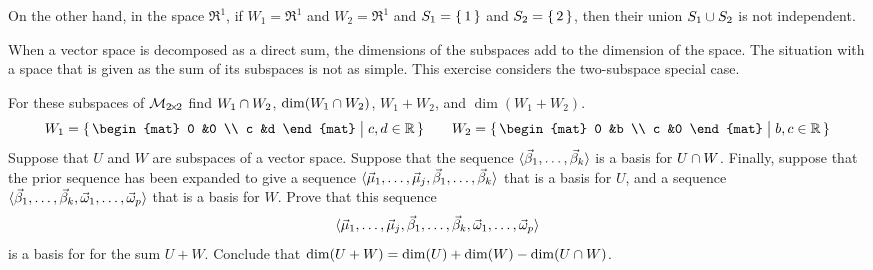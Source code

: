 \begin{exercises}
\begin{answer}
\begin{exparts}
          On the other hand, in the space $\Re^1$, 
          if \( W_1=\Re^1 \) and \( W_2=\Re^1 \) and $S_1=\mbox{$\{\,1\,\}$}$ and
          $S_2=\mbox{$\{\,2\,\}$}$, then their union $S_1\cup S_2$ is not independent.
      \end{exparts}  
     \end{answer}
  \item \label{exer:BasesSumTwoSubs}
    When a vector space is decomposed as a direct sum, the dimensions
    of the subspaces add to the dimension of the space.
    The situation with a space that is given as the sum of its subspaces 
    is not as simple.
    This exercise considers the two-subspace special case.
    \begin{exparts}
      \partsitem For these subspaces of \( \mathcal{M}_{2 \! \times \! 2} \) find
        \( W_1\cap W_2 \), \( \dim(W_1\cap W_2) \),
        \( W_1+W_2 \), and \( \dim(W_1+W_2) \).
        \begin{equation*}
          W_1=\set{\begin{mat}
                    0  &0  \\
                    c  &d
                  \end{mat} \suchthat c,d\in\Re  }
          \qquad
         W_2=\set{\begin{mat}
                    0  &b  \\
                    c  &0
                  \end{mat} \suchthat b,c\in\Re  }
       \end{equation*}
     \partsitem Suppose that \( U \) and \( W \) are subspaces 
       of a vector space.
       Suppose that the sequence 
       \( \langle\vec{\beta}_1,\dots,\vec{\beta}_k\rangle \) 
       is a basis for
       \( U\cap W \).
       Finally, suppose that the prior sequence has been expanded to give
       a sequence \( \langle\vec{\mu}_1,\dots,\vec{\mu}_j,
       \vec{\beta}_1,\dots,\vec{\beta}_k\rangle \)
       that is a basis for \( U \), and a sequence
       \( \langle\vec{\beta}_1,\dots,\vec{\beta}_k,
          \vec{\omega}_1,\dots,\vec{\omega}_p\rangle \)
       that is a basis for \( W \). 
       Prove that this sequence
       \begin{equation*}
         \langle\vec{\mu}_1,\dots,\vec{\mu}_j,
              \vec{\beta}_1,\dots,\vec{\beta}_k,
              \vec{\omega}_1,\dots,\vec{\omega}_p\rangle
       \end{equation*}
       is a basis for for the sum \( U+W \).
      \partsitem Conclude that 
          $\dim (U+W)=\dim(U)+\dim(W)-\dim(U\cap W)$.

\end{exparts}
\end{exercises}
